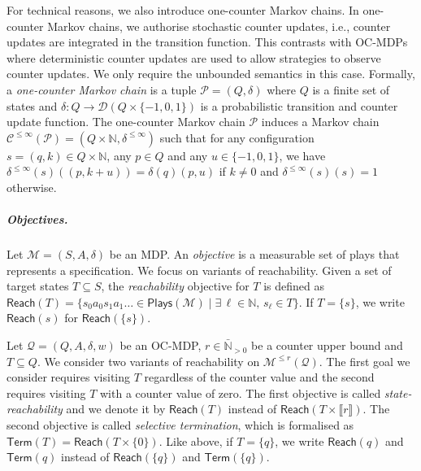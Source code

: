 \documentclass[a4paper,UKenglish,cleveref,autoref,thm-restate,colorlinks]{lipics-v2021}
\newcommand{\integerInterval}[1]{\llbracket{}#1\rrbracket{}}
\newcommand{\IN}{\mathbb{N}}
\newcommand{\INposBar}{\bar{\IN}_{>0}}
\newcommand{\dist}[1]{\mathcal{D}(#1)}
\newcommand{\mdp}{\mathcal{M}}
\newcommand{\mdpStateSpace}{S}
\newcommand{\mdpState}{s}
\newcommand{\mdpActionSpace}{A}
\newcommand{\mdpAction}{a}
\newcommand{\mdpTrans}{\delta}
\newcommand{\mdpTuple}{(\mdpStateSpace, \mdpActionSpace, \mdpTrans)}
\newcommand{\playSet}[1]{\mathsf{Plays}(#1)}
\newcommand{\indexPosition}{\ell}
\newcommand{\weight}{w}
\newcommand{\weightVal}{u}
\newcommand{\ocmdp}{\mathcal{Q}}
\newcommand{\ocmdpFin}[2]{\mdp^{\leq #2}(#1)}
\newcommand{\ocStateSpace}{Q}
\newcommand{\ocState}{q}
\newcommand{\ocStateB}{p}
\newcommand{\ocCount}{k}
\newcommand{\ocConfig}{s}
\newcommand{\ocActionSpace}{A}
\newcommand{\ocTrans}{\delta}
\newcommand{\ocTransInf}{\delta^{\leq \infty}}
\newcommand{\ocTuple}{(\ocStateSpace, \ocActionSpace, \ocTrans, \weight)}
\newcommand{\counterUB}{r}
\newcommand{\mchain}{\mathcal{C}}
\newcommand{\ocChain}{\mathcal{P}}
\newcommand{\ocChainTuple}{(\ocStateSpace, \ocTrans)}
\newcommand{\ocChainFin}[2]{\mchain^{\leq #2}(#1)}
\newcommand{\reach}[1]{\mathsf{Reach}(#1)}
\newcommand{\target}{T}
\newcommand{\termination}{\mathsf{Term}}
\newcommand{\selectiveTermination}[1]{\termination({#1})}
\begin{document}
For technical reasons, we also introduce one-counter Markov chains.
In one-counter Markov chains, we authorise stochastic counter updates, i.e., counter updates are integrated in the transition function.
This contrasts with OC-MDPs where deterministic counter updates are used to allow strategies to observe counter updates.
We only require the unbounded semantics in this case.
Formally, a \textit{one-counter Markov chain} is a tuple $\ocChain = \ocChainTuple$ where $\ocStateSpace$ is a finite set of states and $\ocTrans\colon\ocStateSpace\to\dist{\ocStateSpace\times\{-1, 0, 1\}}$ is a probabilistic transition and counter update function.
The one-counter Markov chain $\ocChain$ induces a Markov chain $\ocChainFin{\ocChain}{\infty}=(\ocStateSpace\times\IN, \ocTransInf)$ such that for any configuration $\ocConfig = (\ocState, \ocCount)\in\ocStateSpace\times\IN$, any $\ocStateB\in\ocStateSpace$ and any $\weightVal\in\{-1, 0, 1\}$, we have $\ocTransInf(\ocConfig)((\ocStateB, \ocCount+\weightVal)) = \ocTrans(\ocState)(\ocStateB, \weightVal)$ if $\ocCount \neq 0$ and $\ocTransInf(\ocConfig)(\ocConfig)=1$ otherwise.


\subparagraph*{Objectives.}
Let $\mdp = \mdpTuple$ be an MDP.
An \textit{objective} is a measurable set of plays that represents a specification.
We focus on variants of reachability.
Given a set of target states $\target\subseteq \mdpStateSpace$, the \textit{reachability} objective for $\target$ is defined as $\reach{\target} = \{\mdpState_0\mdpAction_0\mdpState_1\mdpAction_1\ldots\in\playSet{\mdp}\mid \exists\,\indexPosition\in\IN,\, \mdpState_\indexPosition\in\target\}$.
If $\target=\{\mdpState\}$, we write $\reach{\mdpState}$ for $\reach{\{\mdpState\}}$.

Let $\ocmdp = \ocTuple$ be an OC-MDP, $\counterUB\in\INposBar$ be a counter upper bound and $\target\subseteq\ocStateSpace$.
We consider two variants of reachability on $\ocmdpFin{\ocmdp}{\counterUB}$.
The first goal we consider requires visiting $\target$ regardless of the counter value and the second requires visiting $\target$ with a counter value of zero.
The first objective is called \textit{state-reachability} and we denote it by $\reach{\target}$ instead of $\reach{\target\times\integerInterval{\counterUB}}$.
The second objective is called \textit{selective termination}, which is formalised as $\selectiveTermination{\target} = \reach{\target\times\{0\}}$.
Like above, if $\target=\{\ocState\}$, we write $\reach{\ocState}$ and $\selectiveTermination{\ocState}$ instead of $\reach{\{\ocState\}}$ and $\selectiveTermination{\{\ocState\}}$.
\end{document}
